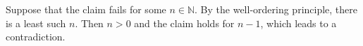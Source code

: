 Suppose that the claim fails for some $n \in \mathbb{N}$.
By the well-ordering principle, there is a least such $n$.
Then $n > 0$ and the claim holds for $n - 1$, which leads to a contradiction.